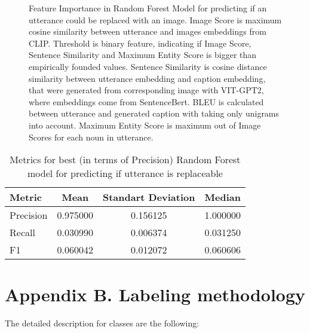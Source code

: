 \documentclass[11pt]{article}
\begin{document}
 
\begin{figure}[pt]
\centering
\caption{Feature Importance in Random Forest Model for predicting if an utterance could be replaced with an image. Image Score is maximum cosine similarity between utterance and images embeddings from CLIP. Threshold is binary feature, indicating if Image Score, Sentence Similarity and Maximum Entity Score is bigger than empirically founded values. Sentence Similarity is cosine distance similarity between utterance embedding and caption embedding, that were generated from corresponding image with VIT-GPT2, where embeddings come from SentenceBert. BLEU is calculated between utterance and generated caption with taking only unigrams into account. Maximum Entity Score is maximum out of Image Scores for each noun in utterance.}
\label{pictorialization::FI}
\end{figure}




\begin{table}[pt]
\begin{center}
\begin{tabular}{lccc}
\hline \bf Metric & Mean & Standart Deviation & Median  \\ \hline
Precision &  0.975000 &  0.156125 &  1.000000 \\
Recall &  0.030990 &  0.006374 &  0.031250 \\
F1 &  0.060042 &  0.012072 &  0.060606 \\
\hline
\end{tabular}
\end{center}
\caption{Metrics for best (in terms of Precision) Random Forest model for predicting if utterance is replaceable}
\label{TableMetricsRF} 
\end{table}



\section*{Appendix B. Labeling methodology}

The detailed description for classes are the following:
\end{document}
